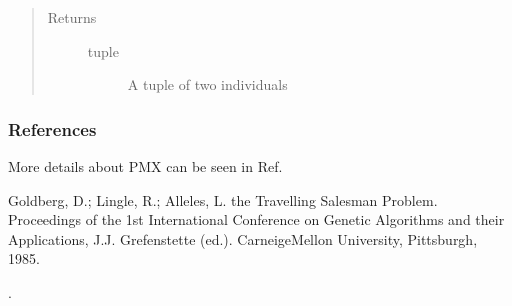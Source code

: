 \documentclass[letterpaper,10pt,english]{sphinxmanual}
\begin{document}
\begin{fulllineitems}
\begin{quote}
\begin{description}
\item[{Returns}] \leavevmode\begin{description}
\item[{tuple}] \leavevmode
\sphinxAtStartPar
A tuple of two individuals

\end{description}

\end{description}\end{quote}
\subsubsection*{References}

\sphinxAtStartPar
More details about PMX can be seen in Ref. %
\begin{footnote}[4]\sphinxAtStartFootnote
Goldberg, D.; Lingle, R.; Alleles, L. the Travelling Salesman Problem.
Proceedings of the 1st International Conference on Genetic Algorithms and
their Applications, J.J. Grefenstette (ed.). Carneige\sphinxhyphen{}Mellon University,
Pittsburgh, 1985.
%
\end{footnote}.

\end{fulllineitems}

\end{document}
